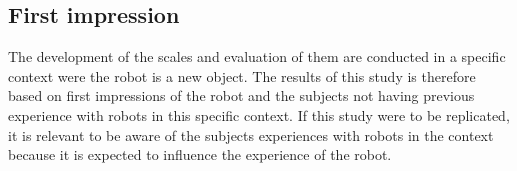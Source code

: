 \subsection{First impression}

The development of the scales and evaluation of them are conducted in a specific context were the robot is a new object. The results of this study is therefore based on first impressions of the robot and the subjects not having previous experience with robots in this specific context. If this study were to be replicated, it is relevant to be aware of the subjects experiences with robots in the context because it is expected to influence the experience of the robot. 